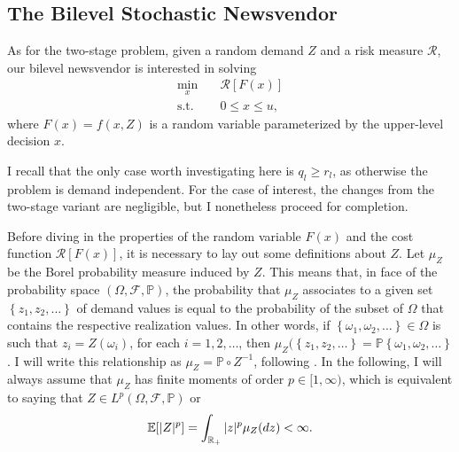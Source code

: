 \documentclass[12pt]{article}
\begin{document}
\subsection*{The Bilevel Stochastic Newsvendor}

As for the two-stage problem, given a random demand $Z$ and a risk measure $\mathcal{R}$, our bilevel newsvendor is interested in solving
\begin{equation}
\begin{split}
    \min_{x} \quad & \mathcal{R}[F(x)] \\
    \textrm{s.t.} \quad & 0\le x\le u
,\end{split}
\end{equation}
where $F(x)=f(x,Z)$ is a random variable parameterized by the upper-level decision $x$.

I recall that the only case worth investigating here is $q_l \ge r_l$, as otherwise the problem is demand independent.
For the case of interest, the changes from the two-stage variant are negligible, but I nonetheless proceed for completion.

Before diving in the properties of the random variable $F(x)$ and the cost function $\mathcal{R}[F(x)]$, it is necessary to lay out some definitions about $Z$.
Let $\mu_Z$ be the Borel probability measure induced by $Z$.
This means that, in face of the probability space $\left( \Omega,\mathcal{F},\mathbb{P} \right)$, the probability that $\mu_Z$ associates to a given set $\left\{ z_1,z_2,\ldots \right\} $ of demand values is equal to the probability of the subset of $\Omega$ that contains the respective realization values. 
In other words, if $\left\{ \omega_1,\omega_2,\ldots \right\}\in \Omega$ is such that $z_i=Z(\omega_i)$, for each $i=1,2,\ldots$, then $\mu_Z(\left\{ z_1,z_2,\ldots \right\} = \mathbb{P}\left\{ \omega_1,\omega_2,\ldots \right\}$.
I will write this relationship as $\mu_Z = \mathbb{P} \circ Z^{-1}$, following \citet{burtscheidtBilevelLinearOptimization2020}.
In the following, I will always assume that $\mu_Z$ has finite moments of order $p\in [1,\infty)$, which is equivalent to saying that $Z \in L^{p}\left( \Omega, \mathcal{F},\mathbb{P} \right)$ or \[
    \mathbb{E}[|Z|^{p}] = \int_{\mathbb{R}_{+}} |z|^{p} \mu_Z(dz) < \infty
.\]
\end{document}
